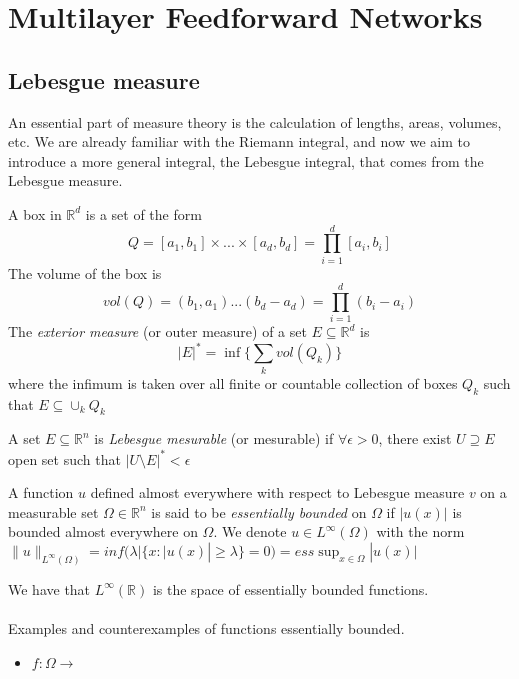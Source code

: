 \documentclass[../main.tex]{subfiles}
\begin{document}
\chapter{Multilayer Feedforward Networks} \label{ch:methods}

\section{Lebesgue measure}
\noindent An essential part of measure theory is the calculation of lengths, areas, volumes, etc. We are already familiar with the Riemann integral, and now we aim to introduce a more general integral, the Lebesgue integral, that comes from the Lebesgue measure. 

\begin{definition} A box in $\mathbb{R}^d$ is a set of the form 
	$$ Q = [a_1,b_1]  \times ... \times [a_d,b_d] = \prod_{i=1}^d [a_i,b_i]$$
	The volume of the box is $$ vol(Q)= (b_1,a_1) ... (b_d-a_d)= \prod_{i=1}^d (b_i-a_i)$$
	The \emph{exterior measure} (or outer measure) of a set $E\subseteq \mathbb{R}^d$ is $$ |E|^* = \inf\{\sum_k vol(Q_k)\} $$ 
	where the infimum is taken over all finite or countable collection of boxes $Q_k$ such that $E \subseteq \cup_k Q_k$
\end{definition}

\begin{definition}
A set $E\subseteq \mathbb{R}^n $ is \emph{Lebesgue mesurable} (or mesurable) if $\forall \epsilon >0$, there exist $U \supseteq E $ open set such that $|U\setminus E|^* < \epsilon $
\end{definition}

\begin{definition}
	A function $u$ defined almost everywhere with respect to Lebesgue measure $v$ on a measurable set $\Omega \in \mathbb{R}^n$ is said to be \emph{essentially bounded} on $\Omega$ if $|u(x)|$ is bounded almost everywhere on $\Omega$. We denote $u\in L^{\infty}(\Omega)$ with the norm $\|u\|_{L^{\infty}(\Omega)}= inf(\lambda | \{ x : |u(x)| \geq \lambda \} = 0 ) = ess \sup_{x\in \Omega} |u(x)|$ 

\end{definition}

We have that $L^{\infty}(\mathbb{R})$ is the space of essentially bounded functions.
\\ \\ 
Examples and counterexamples of functions essentially bounded. 
\begin{itemize}
\item $f:\Omega \rightarrow $
\end{itemize}
\end{document}
